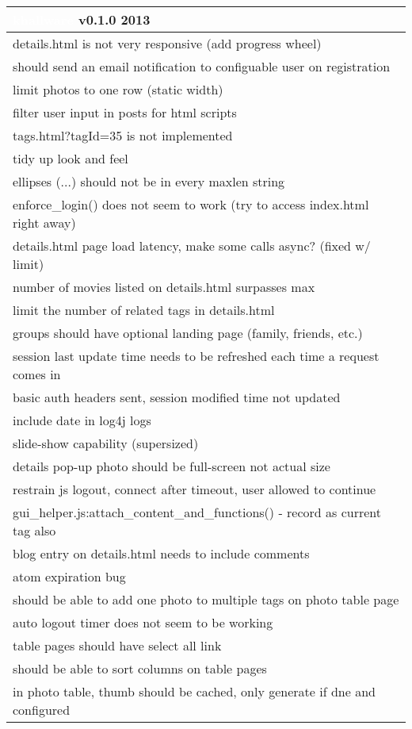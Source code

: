 \documentclass[notitlepage]{article}
\newcommand{\releasedate}{2013}
\begin{document}
\begin{center}
\begin{tabular}{ | l | }
\hline
\LARGE\cellcolor{myblue}\textcolor{white}{khallware} v0.1.0 \releasedate{} \\
\hline
details.html is not very responsive (add progress wheel) \\
\hline
should send an email notification to configuable user on registration \\
\hline
limit photos to one row (static width) \\
\hline
filter user input in posts for html scripts \\
\hline
tags.html?tagId=35 is not implemented \\
\hline
tidy up look and feel \\
\hline
ellipses (...) should not be in every maxlen string \\
\hline
enforce\_login() does not seem to work (try to access index.html right away) \\
\hline
details.html page load latency, make some calls async? (fixed w/ limit) \\
\hline
number of movies listed on details.html surpasses max \\
\hline
limit the number of related tags in details.html \\
\hline
groups should have optional landing page (family, friends, etc.) \\
\hline
session last update time needs to be refreshed each time a request comes in \\
\hline
basic auth headers sent, session modified time not updated \\
\hline
include date in log4j logs \\
\hline
slide-show capability (supersized) \\
\hline
details pop-up photo should be full-screen not actual size \\
\hline
restrain js logout, connect after timeout, user allowed to continue \\
\hline
gui\_helper.js:attach\_content\_and\_functions() - record as current tag also \\
\hline
blog entry on details.html needs to include comments \\
\hline
atom expiration bug \\
\hline
should be able to add one photo to multiple tags on photo table page \\
\hline
auto logout timer does not seem to be working \\
\hline
table pages should have select all link \\
\hline
should be able to sort columns on table pages \\
\hline
in photo table, thumb should be cached, only generate if dne and configured \\
\hline

\end{tabular}
\end{center}
\end{document}
